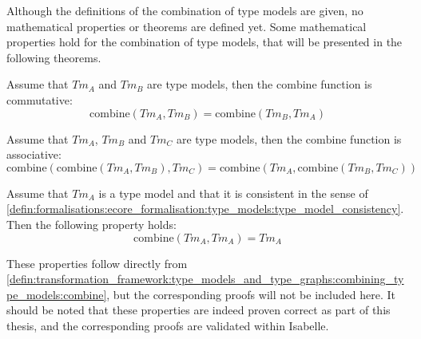 Although the definitions of the combination of type models are given, no mathematical properties or theorems are defined yet. Some mathematical properties hold for the combination of type models, that will be presented in the following theorems.

\begin{thm}
\label{defin:transformation_framework:type_models_and_type_graphs:combining_type_models:tmod_combine_commute}
Assume that $Tm_A$ and $Tm_B$ are type models, then the $\mathrm{combine}$ function is commutative:
\begin{equation*}
    \mathrm{combine}(Tm_A, Tm_B) = \mathrm{combine}(Tm_B, Tm_A)
\end{equation*}
\end{thm}

\begin{thm}
\label{defin:transformation_framework:type_models_and_type_graphs:combining_type_models:tmod_combine_assoc}
Assume that $Tm_A$, $Tm_B$ and $Tm_C$ are type models, then the $\mathrm{combine}$ function is associative:
\begin{equation*}
    \mathrm{combine}(\mathrm{combine}(Tm_A, Tm_B), Tm_C) = \mathrm{combine}(Tm_A, \mathrm{combine}(Tm_B, Tm_C))
\end{equation*}
\end{thm}

\begin{thm}
\label{defin:transformation_framework:type_models_and_type_graphs:combining_type_models:tmod_combine_idemp}
Assume that $Tm_A$ is a type model and that it is consistent in the sense of \cref{defin:formalisations:ecore_formalisation:type_models:type_model_consistency}. Then the following property holds:
\begin{equation*}
    \mathrm{combine}(Tm_A, Tm_A) = Tm_A
\end{equation*}
\end{thm}

These properties follow directly from \cref{defin:transformation_framework:type_models_and_type_graphs:combining_type_models:combine}, but the corresponding proofs will not be included here. It should be noted that these properties are indeed proven correct as part of this thesis, and the corresponding proofs are validated within Isabelle.

